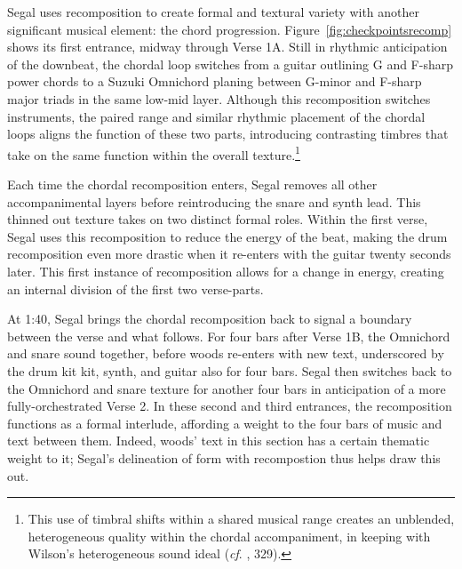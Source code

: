 Segal uses recomposition to create formal and textural variety with another significant musical element: the chord progression. Figure~\ref{fig:checkpointsrecomp} shows its first entrance, midway through Verse 1A. Still in rhythmic anticipation of the downbeat, the chordal loop switches from a guitar outlining G and F-sharp power chords to a Suzuki Omnichord planing between G-minor and F-sharp major triads in the same low-mid layer. Although this recomposition switches instruments, the paired range and similar rhythmic placement of the chordal loops aligns the function of these two parts, introducing contrasting timbres that take on the same function within the overall texture.\footnote{This use of timbral shifts within a shared musical range creates an unblended, heterogeneous quality within the chordal accompaniment, in keeping with Wilson's heterogeneous sound ideal (\textit{cf}.  \cite{ollywilsonHeterogeneousSoundIdeal1992}, 329).}

Each time the chordal recomposition enters, Segal removes all other accompanimental layers before reintroducing the snare and synth lead. This thinned out texture takes on two distinct formal roles. Within the first verse, Segal uses this recomposition to reduce the energy of the beat, making the drum recomposition even more drastic when it re-enters with the guitar twenty seconds later. This first instance of recomposition allows for a change in energy, creating an internal division of the first two verse-parts.

At 1:40, Segal brings the chordal recomposition back to signal a boundary between the verse and what follows. For four bars after Verse 1B, the Omnichord and snare sound together, before woods re-enters with new text, underscored by the drum kit kit, synth, and guitar also for four bars. Segal then switches back to the Omnichord and snare texture for another four bars in anticipation of a more fully-orchestrated Verse 2. In these second and third entrances, the recomposition functions as a formal interlude, affording a weight to the four bars of music and text between them. Indeed, woods' text in this section has a certain thematic weight to it; Segal's delineation of form with recompostion thus helps draw this out.

